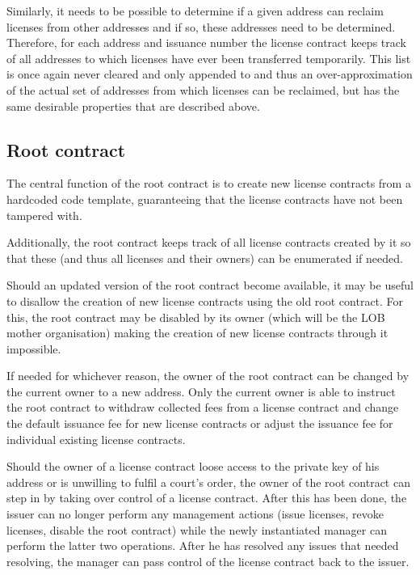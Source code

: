 \documentclass[a4paper]{article}
\begin{document}
Similarly, it needs to be possible to determine if a given address can reclaim licenses from other addresses and if so, these addresses need to be determined. Therefore, for each address and issuance number the license contract keeps track of all addresses to which licenses have ever been transferred temporarily. This list is once again never cleared and only appended to and thus an over-approximation of the actual set of addresses from which licenses can be reclaimed, but has the same desirable properties that are described above.





\subsection{Root contract}
\label{ch:rootContract}

The central function of the root contract is to create new license contracts from a hardcoded code template, guaranteeing that the license contracts have not been tampered with.

Additionally, the root contract keeps track of all license contracts created by it so that these (and thus all licenses and their owners) can be enumerated if needed.

Should an updated version of the root contract become available, it may be useful to disallow the creation of new license contracts using the old root contract. For this, the root contract may be disabled by its owner (which will be the LOB mother organisation) making the creation of new license contracts through it impossible.

If needed for whichever reason, the owner of the root contract can be changed by the current owner to a new address. Only the current owner is able to instruct the root contract to withdraw collected fees from a license contract and change the default issuance fee for new license contracts or adjust the issuance fee for individual existing license contracts.

Should the owner of a license contract loose access to the private key of his address or is unwilling to fulfil a court's order, the owner of the root contract can step in by taking over control of a license contract. After this has been done, the issuer can no longer perform any management actions (issue licenses, revoke licenses, disable the root contract) while the newly instantiated manager can perform the latter two operations. After he has resolved any issues that needed resolving, the manager can pass control of the license contract back to the issuer.
\end{document}
